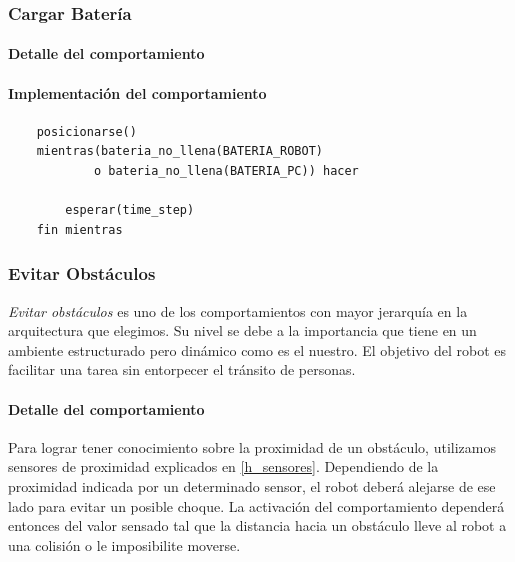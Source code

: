 \subsubsection{Cargar Bater\'ia}
\label{recharge_battery}
\paragraph{Detalle del comportamiento}


\paragraph{Implementaci\'on del comportamiento}
\begin{verbatim}
    posicionarse()
    mientras(bateria_no_llena(BATERIA_ROBOT)
            o bateria_no_llena(BATERIA_PC)) hacer

        esperar(time_step)
    fin mientras
\end{verbatim}

\subsubsection{Evitar Obst\'aculos}
\label{avoid_obstacles}
\emph{Evitar obst\'aculos} es uno de los comportamientos con mayor jerarqu\'ia
en la arquitectura que elegimos. Su nivel se debe a la importancia que tiene
en un ambiente estructurado pero din\'amico como es el nuestro. El objetivo
del robot es facilitar una tarea sin entorpecer el tr\'ansito de personas.
\\
\paragraph{Detalle del comportamiento}
Para lograr tener conocimiento sobre la proximidad de un obst\'aculo, utilizamos
sensores de proximidad explicados en \ref{h_sensores}. Dependiendo de la
proximidad indicada por un determinado sensor, el robot deber\'a alejarse
de ese lado para evitar un posible choque. La activaci\'on del comportamiento
depender\'a entonces del valor sensado tal que la distancia
hacia un obst\'aculo lleve al robot a una colisi\'on o le imposibilite
moverse.
